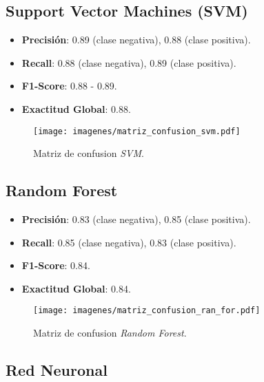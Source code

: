\documentclass[conference]{IEEEtran}
\begin{document}
\FloatBarrier


\subsection*{Support Vector Machines (SVM)}

\begin{itemize}
\item \textbf{Precisión}: 0.89 (clase negativa), 0.88 (clase positiva).
\item \textbf{Recall}: 0.88 (clase negativa), 0.89 (clase positiva).
\item \textbf{F1-Score}: 0.88 - 0.89.
\item \textbf{Exactitud Global}: 0.88.
\end{itemize}

\begin{figure}[h]
    \centering
    \texttt{[image: imagenes/matriz\_confusion\_svm.pdf]}
    \caption{Matriz de confusion \textit{SVM}.}
    \label{fig:svm}
\end{figure}

\FloatBarrier


\subsection*{Random Forest}

\begin{itemize}
\item \textbf{Precisión}: 0.83 (clase negativa), 0.85 (clase positiva).
\item \textbf{Recall}: 0.85 (clase negativa), 0.83 (clase positiva).
\item \textbf{F1-Score}: 0.84.
\item \textbf{Exactitud Global}: 0.84.
\end{itemize}

\begin{figure}[h]
    \centering
    \texttt{[image: imagenes/matriz\_confusion\_ran\_for.pdf]}
    \caption{Matriz de confusion \textit{Random Forest}.}
    \label{fig:rand_f}
\end{figure}

\FloatBarrier

\newpage 

\subsection*{Red Neuronal}
\end{document}
